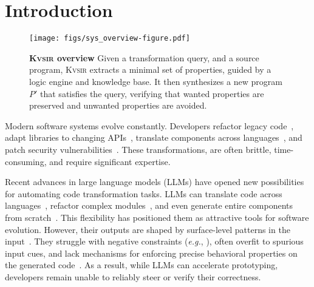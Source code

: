 \documentclass[sigplan]{acmart}
\def\eg{{\em e.g.}, }
\newcommand{\sys}{{\scshape Kv{\textalpha}sir}\xspace}
\begin{document}
\section{Introduction}
\begin{figure}[t]
  \texttt{[image: figs/sys\_overview-figure.pdf]}
  \caption{\textbf{\sys overview}
Given a transformation query, and a source program, \sys extracts a minimal set
  of properties,
  guided by a logic engine and knowledge base.
  It then synthesizes a new program $P'$ that satisfies the query, verifying
  that wanted properties are preserved and unwanted properties are avoided.
}
\end{figure}



Modern software systems evolve constantly.
Developers refactor legacy code~\cite{Fowler99,Mens04,facebook2010redesigns,dropbox2014syncengine},
adapt libraries to changing APIs~\cite{dig2005role,kula2017empiricalstudyimpactrefactoring},
translate components across languages~\cite{manzoor_cli_python,gaultier_rewrite_cpp},
and patch security vulnerabilities~\cite{ikegami2022userefactoringsecurityvulnerability,schneier2013security_vulnerabilities}.
These transformations, are often brittle, time-consuming, and require significant expertise.

Recent advances in large language models (LLMs) have opened new possibilities for automating code transformation tasks.
LLMs can translate code across languages~\cite{ou2025enhancingllmbasedcodetranslation},
refactor complex modules~\cite{ziftci2025migrating},
and even generate entire components from scratch~\cite{huynh2025largelanguagemodelscode}.
This flexibility has positioned them as attractive tools for software evolution.
However, their outputs are shaped by surface-level patterns in the input~\cite{yang2025evaluatinggeneralizationcapabilitieslarge}.
They struggle with negative constraints (\eg {}), often overfit to spurious input cues, and lack mechanisms for enforcing precise behavioral properties on the generated code~\cite{xu2023llmfoolitselfpromptbased, wu2023deceptpromptexploitingllmdrivencode,jiang2024llmsdreamelephantswhen,hwang2024thinkpinkelephant,roh2025breakthechainreasoningfailuresllms}.
As a result, while LLMs can accelerate prototyping, developers remain unable to reliably steer or verify their correctness.
\end{document}
